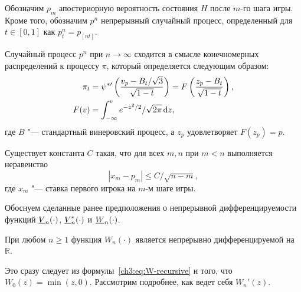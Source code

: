 {Обозначим $p_m$ апостериорную вероятность состояния $H$ после $m$-го шага игры.
Кроме того, обозначим $p^n$ непрерывный случайный процесс, определенный для $t \in [0, 1]$ как $p^n_t = p_{[nt]}$.

\begin{proposition}
  Случайный процесс $p^n$ при $n \rightarrow \infty$ сходится в смысле конечномерных распределений к процессу $\pi$, который определяется следующим образом:
  \begin{align*}
    \pi_t &= \psi^{*\prime} \left(
      \frac{v_p - B_t/\sqrt{3}}{\sqrt{1-t}}
    \right) =
    F\left( \frac{z_p - B_t}{\sqrt{1-t}} \right),\\
    F(v) &= \int_{-\infty}^v e^{-z^2/2}/\sqrt{2\pi} \mathop{}\!\mathrm{d} z,
  \end{align*}
  где $B$ "--- стандартный винеровский процесс, а $z_p$ удовлетворяет $F(z_p) = p$.
\end{proposition}

\begin{proposition}
  Существует константа $C$ такая, что для всех $m, n$ при $m < n$ выполняется неравенство
  \begin{equation*}
    | x_m - p_m | \leq C / \sqrt{n - m},
  \end{equation*}
  где $x_m$ "--- ставка первого игрока на $m$-м шаге игры.
\end{proposition}

Обоснуем сделанные ранее предположения о непрерывной дифференцируемости функций $\LV{n}(\cdot)$, $\LV[*]{n}(\cdot)$ и $\LW{n}(\cdot)$.

\begin{proposition}
  При любом $n \geqslant 1$ функция $W_n(\cdot)$ является непрерывно дифференцируемой на $\mathbb{R}$.
\end{proposition}
Это сразу следует из формулы~\eqref{ch3:eq:W-recursive} и того, что $W_0(z) = \min(z, 0)$.
Рассмотрим подробнее, как ведет себя $W_n'(z)$.

}
